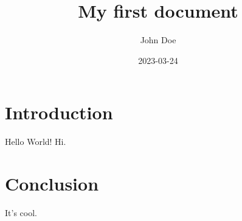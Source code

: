 \documentclass{article}
\title{My first document}
\date{2023-03-24}
\author{John Doe}
\begin{document}
  \maketitle 
  
  \section{Introduction}
  Hello World! Hi.

  \section{Conclusion}
  It's cool.
  
\end{document}
